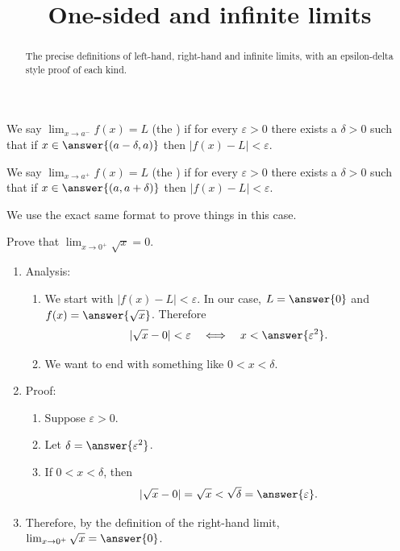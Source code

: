 \documentclass{ximera}
\title{One-sided and infinite limits}
\begin{document}
\begin{abstract}
The precise definitions of left-hand, right-hand and infinite limits, with an epsilon-delta style proof of each kind.
\end{abstract}
\maketitle

\begin{definition}
\label{definition:3-1}
We say $\lim_{x \rightarrow a^{-}} f(x)=L$ (the ) if for every $\varepsilon>0$ there exists a $\delta>0$ such that if
$x\in\answer{(a-\delta,a)}$ then $|f(x)-L|<\varepsilon$.

We say $\lim_{x \rightarrow a^{+}} f(x)=L$ (the ) if for every $\varepsilon>0$ there exists a $\delta>0$ such that if
$x\in\answer{(a,a+\delta)}$ then $|f(x)-L|<\varepsilon$.
\end{definition}

We use the exact same format to prove things in this case.

\begin{example}
\label{example:3-2}
Prove that $\lim_{x \rightarrow 0^{+}} \sqrt{x}=0$.

\begin{enumerate}
  \item Analysis:
  \begin{enumerate}
    \item We start with $|f(x)-L|<\varepsilon$. In our case, $L=\answer{0}$ and $f(x)=\answer{\sqrt{x}}$. Therefore
    \[
    |\sqrt{x}-0|<\varepsilon \quad\Longleftrightarrow\quad x<\answer{\varepsilon^{2}}.
    \]
    \item We want to end with something like $0<x<\delta$.
  \end{enumerate}
  \item Proof:
  \begin{enumerate}
    \item Suppose $\varepsilon>0$.
    \item Let $\delta=\answer{\varepsilon^{2}}$.
    \item If $0<x<\delta$, then
    \[
    |\sqrt{x}-0|=\sqrt{x}<\sqrt{\delta}=\answer{\varepsilon}.
    \]
  \end{enumerate}
  \item Therefore, by the definition of the right-hand limit, $\lim_{x \rightarrow 0^{+}} \sqrt{x}=\answer{0}$.
\end{enumerate}
\end{example}
\end{document}

